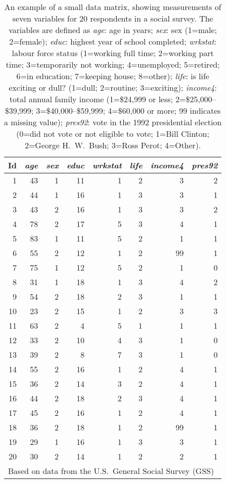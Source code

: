 \begin{table}
\caption{An example of a small data matrix, showing measurements of
seven variables for 20 respondents in a social survey. The variables
are defined as \emph{age}: age in years;
\emph{sex}: sex (1=male; 2=female);
\emph{educ}: highest year of school completed;
\emph{wrkstat}: labour force status (1=working full time; 2=working part time;
3=temporarily not working; 4=unemployed; 5=retired; 6=in
education; 7=keeping house; 8=other);
\emph{life}: is life exciting or dull? (1=dull; 2=routine; 3=exciting);
\emph{income4}: total annual family income (1=\$24,999 or less;
2=\$25,000--\$39,999;
3=\$40,000--\$59,999;
4=\$60,000 or more;
99 indicates a missing value);
\emph{pres92}: vote in the 1992 presidential election
(0=did not vote or not eligible to vote; 1=Bill Clinton; 2=George H.\
W.\ Bush; 3=Ross Perot; 4=Other).
}
\label{t_datamatrix}
\begin{center}
\begin{tabular}{|r|r|r|r|r|r|r|r|}\hline
Id & \emph{age} & \emph{sex} & \emph{educ} & \emph{wrkstat} &
\emph{life} & \emph{income4} & \emph{pres92} \\
\hline \hline
1&43&1&11&1&2&3&2\\\hline
2&44&1&16&1&3&3&1\\\hline
3&43&2&16&1&3&3&2\\\hline
4&78&2&17&5&3&4&1\\\hline
5&83&1&11&5&2&1&1\\\hline
6&55&2&12&1&2&99&1\\\hline
7&75&1&12&5&2&1&0\\\hline
8&31&1&18&1&3&4&2\\\hline
9&54&2&18&2&3&1&1\\\hline
10&23&2&15&1&2&3&3\\\hline
11&63&2&4&5&1&1&1\\\hline
12&33&2&10&4&3&1&0\\\hline
13&39&2&8&7&3&1&0\\\hline
14&55&2&16&1&2&4&1\\\hline
15&36&2&14&3&2&4&1\\\hline
16&44&2&18&2&3&4&1\\\hline
17&45&2&16&1&2&4&1\\\hline
18&36&2&18&1&2&99&1\\\hline
19&29&1&16&1&3&3&1\\\hline
20&30&2&14&1&2&2&1\\\hline
\multicolumn{8}{l}{{\footnotesize Based on data from the U.S.\ General
Social Survey (GSS)}}
\end{tabular}
\end{center}
\end{table}


